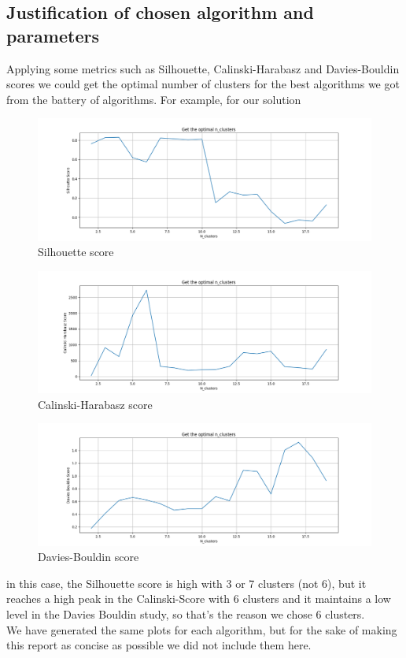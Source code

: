 \documentclass[12pt]{article}
\begin{document}
\subsection{Justification of chosen algorithm and parameters} \label{MSData:Jus}
Applying some metrics such as Silhouette, Calinski-Harabasz and  Davies-Bouldin scores we could get the optimal number of clusters for the best algorithms we got from the battery of algorithms. For example, for our solution

\begin{figure}[H]
    \centering
    \includegraphics[scale=0.4]{Figure_17(SpecClus_10_Silhouette).png}
    \caption{Silhouette score}
\end{figure}

\begin{figure}[H]
    \centering
    \includegraphics[scale=0.4]{Figure_18(SpecClus_10_Calinski).png}
    \caption{Calinski-Harabasz score}
\end{figure}

\begin{figure}[H]
    \centering
    \includegraphics[scale=0.4]{Figure_19(SpecClus_10_Davies).png}
    \caption{Davies-Bouldin score}
\end{figure}

in this case, the Silhouette score is high with 3 or 7 clusters (not 6), but it reaches a high peak in the Calinski-Score with 6 clusters and it maintains a low level in the Davies Bouldin study, so that's the reason we chose 6 clusters. \\

We have generated the same plots for each algorithm, but for the sake of making this report as concise as possible we did not include them here.
\end{document}
